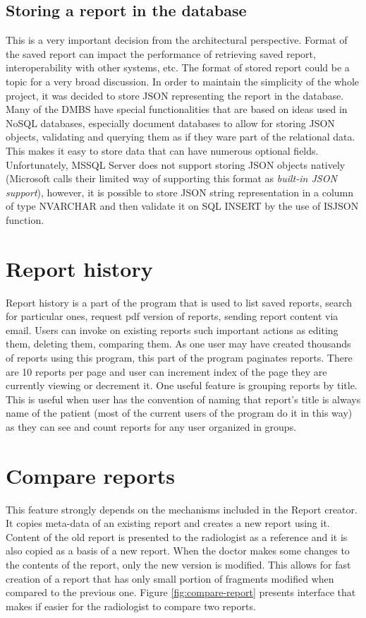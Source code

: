 \documentclass[12pt, twoside, openany]{report}
\theoremstyle{definition}
\begin{document}
\subsection{Storing a report in the database}
This is a very important decision from the architectural perspective. Format of the saved report can impact the performance of retrieving saved report, interoperability with other systems, etc. The format of stored report could be a topic for a very broad discussion. In order to maintain the simplicity of the whole project, it was decided to store JSON representing the report in the database. Many of the DMBS have special functionalities that are based on ideas used in NoSQL databases, especially document databases to allow for storing JSON objects, validating and querying them as if they ware part of the relational data. This makes it easy to store data that can have numerous optional fields. Unfortunately, MSSQL Server does not support storing JSON objects natively (Microsoft calls their limited way of supporting this format as \textit{built-in JSON support}\cite{microsoft-json-support}), however, it is possible to store JSON string representation in a column of type NVARCHAR and then validate it on SQL INSERT by the use of ISJSON function.
\section{Report history}
Report history is a part of the program that is used to list saved reports, search for particular ones, request pdf version of reports, sending report content via email. Users can invoke on existing reports such important actions as editing them, deleting them, comparing them. As one user may have created thousands of reports using this program, this part of the program paginates reports. There are 10 reports per page and user can increment index of the page they are currently viewing or decrement it. 
One useful feature is grouping reports by title. This is useful when user has the convention of naming that report's title is always name of the patient (most of the current users of the program do it in this way) as they can see and count reports for any user organized in groups. 

\section{Compare reports}
This feature strongly depends on the mechanisms included in the Report creator. It copies meta-data of an existing report and creates a new report using it. Content of the old report is presented to the radiologist as a reference and it is also copied as a basis of a new report. When the doctor makes some changes to the contents of the report, only the new version is modified. This allows for fast creation of a report that has only small portion of fragments modified when compared to the previous one.
Figure \ref{fig:compare-report} presents interface that makes if easier for the radiologist to compare two reports.
\end{document}
